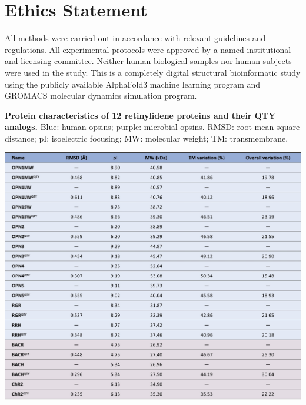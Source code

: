 \documentclass[fleqn, 10pt, lineno]{manuscript}
\begin{document}
\section*{Ethics Statement}

All methods were carried out in accordance with relevant guidelines and regulations. All experimental protocols were approved by a named institutional and licensing committee. Neither human biological samples nor human subjects were used in the study. This is a completely digital structural bioinformatic study using the publicly available AlphaFold3 machine learning program and GROMACS molecular dynamics simulation program.




\begin{table}[htbp]
	\centering
	\caption{\textbf{Protein characteristics of 12 retinylidene proteins and their QTY analogs. } Blue: human opsins; purple: microbial opsins. RMSD: root mean square distance; pI: isoelectric focusing; MW: molecular weight; TM: transmembrane. }
	\label{tb:characteristics}
	\includegraphics[width=\linewidth]{Figures/characteristics.jpg}
\end{table}
\end{document}
